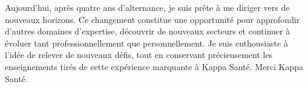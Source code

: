 Aujourd’hui, après quatre ans d'alternance, je suis prête à me diriger vers de nouveaux horizons. Ce changement constitue une opportunité pour approfondir d'autres domaines d'expertise, découvrir de nouveaux secteurs et continuer à évoluer tant professionnellement que personnellement. Je suis enthousiaste à l’idée de relever de nouveaux défis, tout en conservant précieusement les enseignements tirés de cette expérience marquante à Kappa Santé. Merci Kappa Santé.

